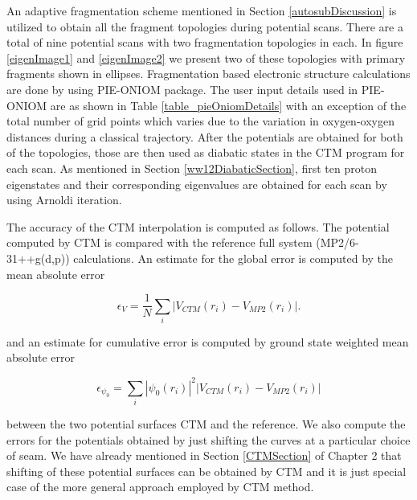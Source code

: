An adaptive fragmentation scheme mentioned in Section \ref{autosubDiscussion} is utilized to obtain all the
fragment topologies during potential scans. There are a total of nine potential scans with two fragmentation
topologies in each. In figure \ref{eigenImage1} and \ref{eigenImage2} we present two of these topologies with
primary fragments shown in ellipses. Fragmentation based electronic structure calculations are done by using
PIE-ONIOM package. The user input details used in PIE-ONIOM are as shown in Table \ref{table_pieOniomDetails}
with an exception of the total number of grid points which varies due to the variation in oxygen-oxygen distances
during a classical trajectory. After the potentials are obtained for both of the topologies, those are then used
as diabatic states in the CTM program for each scan. As mentioned in Section \ref{ww12DiabaticSection}, first
ten proton eigenstates and their corresponding eigenvalues are obtained for each scan by using Arnoldi
iteration.

The accuracy of the CTM interpolation is computed as follows. The potential computed by CTM is compared with
the reference full system (MP2/6-31++g(d,p)) calculations. An estimate for the global error is computed by the
mean absolute error

\begin{equation}
\epsilon_{V} = \frac{1}{N} \sum_{i}^{}|V_{CTM}(r_{i}) - V_{MP2}(r_{i})|.
\label{meanAbsoluteError}
\end{equation}

\noindent and an estimate for cumulative error is computed by ground state weighted mean absolute error

\begin{equation}
\epsilon_{\psi_{0}} = \sum_{i} |\psi_{0}(r_{i})|^2 |V_{CTM}(r_{i}) - V_{MP2}(r_{i})|
\label{groundStateWeightedErr}
\end{equation}

\noindent between the two potential surfaces CTM and the reference.
We also compute the errors for the potentials obtained by just shifting the curves at
a particular choice of seam. We have already mentioned in Section \ref{CTMSection}
of Chapter 2 that shifting of these potential surfaces can be obtained by CTM and it is just
special case of the more general approach employed by CTM method.

